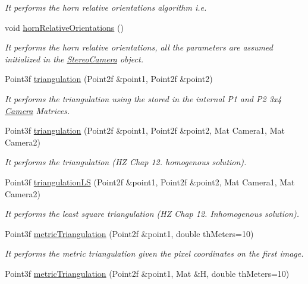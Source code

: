 \begin{DoxyCompactItemize}
\begin{DoxyCompactList}\small\item\em It performs the horn relative orientations algorithm i.\+e. \end{DoxyCompactList}\item 
void \hyperlink{classStereoCamera_a36dae897d07544e8faca8c90216173a6}{horn\+Relative\+Orientations} ()
\begin{DoxyCompactList}\small\item\em It performs the horn relative orientations, all the parameters are assumed initialized in the \hyperlink{classStereoCamera}{Stereo\+Camera} object. \end{DoxyCompactList}\item 
Point3f \hyperlink{classStereoCamera_a3c8ef84424fa111c63437a3db8f04333}{triangulation} (Point2f \&point1, Point2f \&point2)
\begin{DoxyCompactList}\small\item\em It performs the triangulation using the stored in the internal P1 and P2 3x4 \hyperlink{classCamera}{Camera} Matrices. \end{DoxyCompactList}\item 
Point3f \hyperlink{classStereoCamera_ab68c8d3bd07f542243d681fbe8c8c6b7}{triangulation} (Point2f \&point1, Point2f \&point2, Mat Camera1, Mat Camera2)
\begin{DoxyCompactList}\small\item\em It performs the triangulation (H\+Z Chap 12. homogenous solution). \end{DoxyCompactList}\item 
Point3f \hyperlink{classStereoCamera_aaef25d8723eefdbab6e27c348492126b}{triangulation\+L\+S} (Point2f \&point1, Point2f \&point2, Mat Camera1, Mat Camera2)
\begin{DoxyCompactList}\small\item\em It performs the least square triangulation (H\+Z Chap 12. Inhomogenous solution). \end{DoxyCompactList}\item 
Point3f \hyperlink{classStereoCamera_a2fcd3e1767bcf04716b0e2ac76098430}{metric\+Triangulation} (Point2f \&point1, double th\+Meters=10)
\begin{DoxyCompactList}\small\item\em It performs the metric triangulation given the pixel coordinates on the first image. \end{DoxyCompactList}\item 
Point3f \hyperlink{classStereoCamera_a3cf53fac6336eea107a26bd5cdbbdd03}{metric\+Triangulation} (Point2f \&point1, Mat \&H, double th\+Meters=10)

\end{DoxyCompactItemize}

